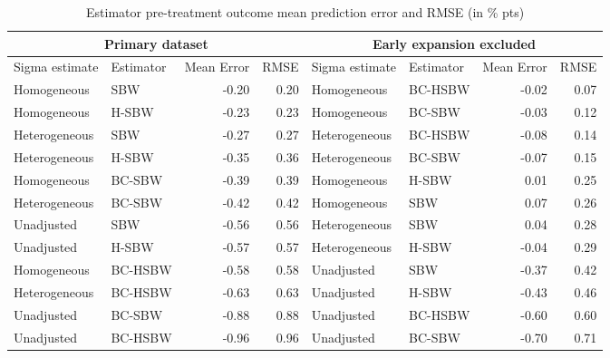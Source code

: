 \documentclass[aoas]{imsart}
\theoremstyle{plain}
\theoremstyle{remark}
\begin{document}
\begin{table}\caption{Estimator pre-treatment outcome mean prediction error and RMSE (in \% pts)}\label{tab:pretxpred}
\centering
\begin{tabular}{llrrllrr}
\hline
\multicolumn{4}{c}{Primary dataset} & \multicolumn{4}{c}{Early expansion 
 excluded} \\ 
 \hline
Sigma estimate & Estimator & Mean Error & RMSE & Sigma estimate & Estimator & Mean Error & RMSE \\ 
\hline
Homogeneous & SBW & -0.20 & 0.20 & Homogeneous & BC-HSBW & -0.02 & 0.07 \\ 
Homogeneous & H-SBW & -0.23 & 0.23 & Homogeneous & BC-SBW & -0.03 & 0.12 \\ 
Heterogeneous & SBW & -0.27 & 0.27 & Heterogeneous & BC-HSBW & -0.08 & 0.14 \\ 
Heterogeneous & H-SBW & -0.35 & 0.36 & Heterogeneous & BC-SBW & -0.07 & 0.15 \\ 
Homogeneous & BC-SBW & -0.39 & 0.39 & Homogeneous & H-SBW & 0.01 & 0.25 \\ 
Heterogeneous & BC-SBW & -0.42 & 0.42 & Homogeneous & SBW & 0.07 & 0.26 \\ 
Unadjusted & SBW & -0.56 & 0.56 & Heterogeneous & SBW & 0.04 & 0.28 \\ 
Unadjusted & H-SBW & -0.57 & 0.57 & Heterogeneous & H-SBW & -0.04 & 0.29 \\ 
Homogeneous & BC-HSBW & -0.58 & 0.58 & Unadjusted & SBW & -0.37 & 0.42 \\ 
Heterogeneous & BC-HSBW & -0.63 & 0.63 & Unadjusted & H-SBW & -0.43 & 0.46 \\ 
Unadjusted & BC-SBW & -0.88 & 0.88 & Unadjusted & BC-HSBW & -0.60 & 0.60 \\ 
Unadjusted & BC-HSBW & -0.96 & 0.96 & Unadjusted & BC-SBW & -0.70 & 0.71 \\ 
 \hline
\end{tabular}
\end{table}
\end{document}
